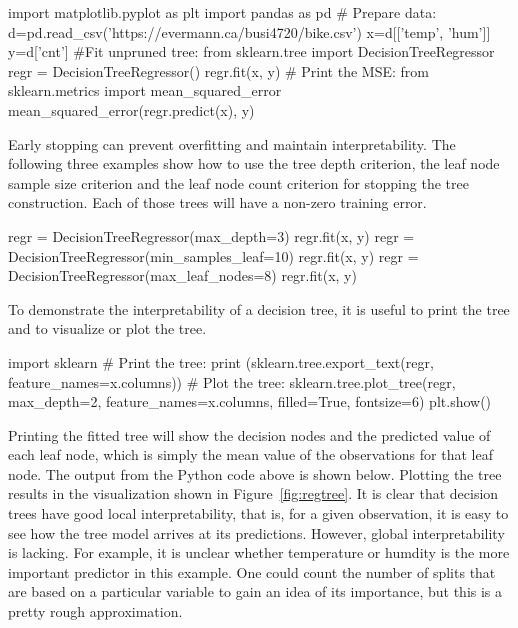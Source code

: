 \begin{samepage}
\begin{pythoncode}
import matplotlib.pyplot as plt
import pandas as pd
# Prepare data:
d=pd.read_csv('https://evermann.ca/busi4720/bike.csv')
x=d[['temp', 'hum']]
y=d['cnt']
#Fit unpruned tree:
from sklearn.tree import DecisionTreeRegressor
regr = DecisionTreeRegressor()
regr.fit(x, y)
# Print the MSE:
from sklearn.metrics import mean_squared_error
mean_squared_error(regr.predict(x), y)
\end{pythoncode}
\end{samepage}

Early stopping can prevent overfitting and maintain interpretability. The following three examples show how to use the tree depth criterion, the leaf node sample size criterion and the leaf node count criterion for stopping the tree construction. Each of those trees will have a non-zero training error.

\begin{samepage}
\begin{pythoncode}
regr = DecisionTreeRegressor(max_depth=3)
regr.fit(x, y)
regr = DecisionTreeRegressor(min_samples_leaf=10)
regr.fit(x, y)
regr = DecisionTreeRegressor(max_leaf_nodes=8)
regr.fit(x, y)
\end{pythoncode}
\end{samepage}

To demonstrate the interpretability of a decision tree, it is useful to print the tree and to visualize or plot the tree. 

\begin{samepage}
\begin{pythoncode}
import sklearn
# Print the tree:
print (sklearn.tree.export_text(regr, feature_names=x.columns))
# Plot the tree:
sklearn.tree.plot_tree(regr, max_depth=2, feature_names=x.columns, 
    filled=True, fontsize=6)
plt.show()
\end{pythoncode}
\end{samepage}

Printing the fitted tree will show the decision nodes and the predicted value of each leaf node, which is simply the mean value of the observations for that leaf node. The output from the Python code above is shown below. Plotting the tree results in the visualization shown in Figure~\ref{fig:regtree}. It is clear that decision trees have good local interpretability, that is, for a given observation, it is easy to see how the tree model arrives at its predictions. However, global interpretability is lacking. For example, it is unclear whether temperature or humdity is the more important predictor in this example. One could count the number of splits that are based on a particular variable to gain an idea of its importance, but this is a pretty rough approximation. 

